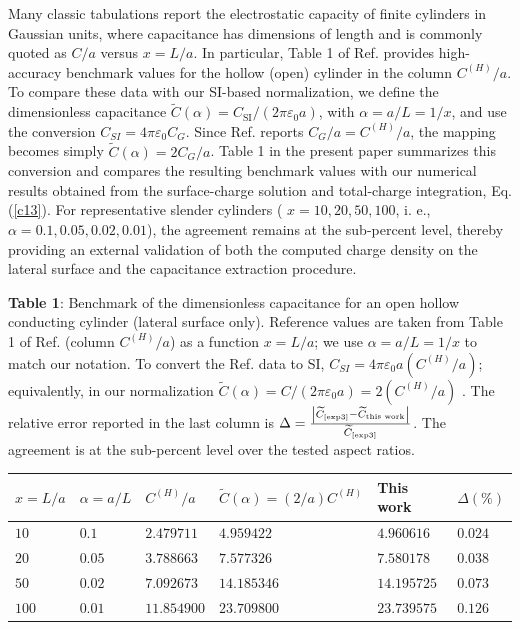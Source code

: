 \documentclass[12pt]{article}
\begin{document}
Many classic tabulations report the electrostatic capacity of finite cylinders
in Gaussian units, where capacitance has dimensions of length and is commonly
quoted as $C/a$ versus $x=L/a$. In particular, Table 1 of Ref.\cite{exp3}
provides high-accuracy benchmark values for the hollow (open) cylinder in the
column $C^{(H)}/a$. To compare these data with our SI-based normalization, we
define the dimensionless capacitance $\widetilde{C}(\alpha)=C_{\text{SI}%
}/(2\pi\varepsilon_{0}a)$, with $\alpha=a/L=1/x$, and use the conversion
$C_{SI}=4\pi\varepsilon_{0}C_{G}$. Since Ref.\cite{exp3} reports
$C_{G}/a=C^{(H)}/a$, the mapping becomes simply $\widetilde{C}(\alpha
)=2C_{G}/a$. Table 1 in the present paper summarizes this conversion and
compares the resulting benchmark values with our numerical results obtained
from the surface-charge solution and total-charge integration, Eq.
(\ref{c13}). For representative slender cylinders ( $x=10,20,50,100$, i. e.,
$\alpha=0.1,0.05,0.02,0.01$), the agreement remains at the sub-percent level,
thereby providing an external validation of both the computed charge density
on the lateral surface and the capacitance extraction procedure.\newline 

\textbf{Table 1}: Benchmark of the dimensionless capacitance for an open
hollow conducting cylinder (lateral surface only). Reference values are taken
from Table 1 of Ref.\cite{exp3} (column $C^{(H)}/a$) as a function $x=L/a$; we
use $\alpha=a/L=1/x$ to match our notation. To convert the Ref.\cite{exp3}
data to SI, $C_{SI}=4\pi\varepsilon_{0}a(C^{(H)}/a)$; equivalently, in our
normalization $\widetilde{C}(\alpha)=C/(2\pi\varepsilon_{0}a)=2(C^{(H)}/a)$ .
The relative error reported in the last column is $\Delta=\frac{\left|
\widetilde{C}_{\text{\cite{exp3}}}-\widetilde{C}_{\text{this work}}\right|
}{\widetilde{C}_{\text{\cite{exp3}}}} $. The agreement is at the sub-percent
level over the tested aspect ratios.

\begin{center}%
\begin{tabular}
[c]{llllll}\hline\hline
$x=L/a$ & $\alpha=a/L$ & $C^{(H)}/a$\cite{exp3} & $\widetilde{C}%
(\alpha)=(2/a)C^{(H)}$\cite{exp3} & This work & $\Delta(\%)$\\\hline\hline
$10$ & $0.1$ & $2.479711$ & $4.959422$ & $4.960616$ & $0.024$\\
$20$ & $0.05$ & $3.788663$ & $7.577326$ & $7.580178$ & $0.038$\\
$50$ & $0.02$ & $7.092673$ & $14.185346$ & $14.195725$ & $0.073$\\
$100$ & $0.01$ & $11.854900$ & $23.709800$ & $23.739575$ & $0.126$%
\\\hline\hline
\end{tabular}
\end{center}
\end{document}
